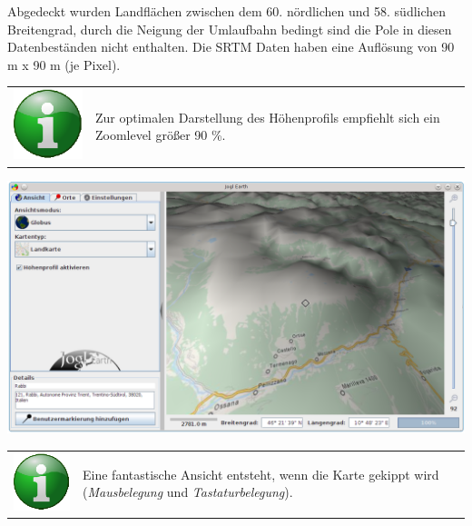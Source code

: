\documentclass[10pt]{scrreprt}
\newcommand{\textref}[1]{\mbox{\raisebox{0.1ex}{\small$\rightarrow$ }\textit{#1}}}
\begin{document}
Abgedeckt wurden Landflächen zwischen dem 60. nördlichen und 58. südlichen Breitengrad, durch die Neigung der Umlaufbahn bedingt sind die Pole in diesen Datenbeständen nicht enthalten. Die SRTM Daten haben eine Auflösung von 90 m x 90 m (je Pixel).

\vspace{3mm}
\begin{tabular}{>{\centering \arraybackslash}m{1cm} m{14cm}}
\includegraphics[scale=0.5]{images/info.eps} &  Zur optimalen Darstellung des Höhenprofils empfiehlt sich ein Zoomlevel größer 90 \%. \\ 
\end{tabular} 

\vspace{3mm}
\begin{center}
\includegraphics[scale=0.3]{images/heightmap1.png}
\end{center}


\vspace{3mm}
\begin{tabular}{>{\centering \arraybackslash}m{1cm} m{14cm}}
\includegraphics[scale=0.5]{images/info.eps} &  Eine fantastische Ansicht entsteht, wenn die Karte gekippt wird (\textref{Mausbelegung} und \textref{Tastaturbelegung}). \\ 
\end{tabular} 
\end{document}
